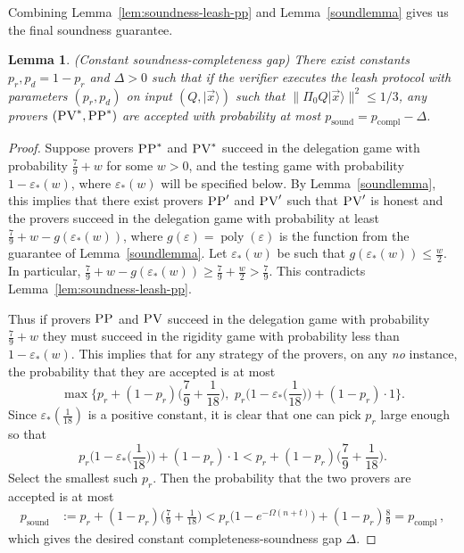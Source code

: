 \documentclass[11pt]{article}
\newtheorem{lemma}[theorem]{Lemma}
\theoremstyle{remark}
\theoremstyle{definition}
\newcommand{\ket}[1]{|#1\rangle}
\DeclareMathOperator{\poly}{poly}
\newcommand{\eps}{\varepsilon}
\newcommand{\pv}{\textsc{PV}}
\newcommand{\pp}{\textsc{PP}}
\begin{document}
\noindent Combining Lemma~\ref{lem:soundness-leash-pp} and Lemma~\ref{soundlemma} gives us the final soundness guarantee.

\begin{lemma}\label{lem:leash-soundness} (Constant soundness-completeness gap)
There exist constants $p_r,p_d=1-p_r$ and $\Delta>0$ such that if the verifier executes the leash protocol with parameters $(p_r,p_d)$ on input $(Q,\ket{\vec{x}})$ such that $\|\Pi_0 Q\ket{\vec{x}}\|^2 \leq 1/3$, any provers $(\pv^*,\pp^*)$ are accepted with probability at most \mbox{$p_{\mathrm{sound}}=p_{\mathrm{compl}}-\Delta$}.  
\end{lemma}

\begin{proof}
Suppose provers $\pp^*$ and $\pv^*$ succeed in the delegation game with probability $\frac79+w$ for some $w>0$, and the testing game with probability $1-\eps_*(w)$, where $\eps_*(w)$ will be specified below. By Lemma~\ref{soundlemma}, this implies that there exist provers $\pp'$ and $\pv'$ such that $\pv'$ is honest and the provers succeed in the delegation game with probability at least $\frac79+w-g(\eps_*(w))$, where $g(\eps) = \poly(\eps)$ is the function from the guarantee of Lemma~\ref{soundlemma}. Let $\eps_*(w)$ be such that $g(\eps_*(w)) \leq \frac{w}{2}$. In particular, $\frac79+w-g(\eps_*(w)) \geq \frac79+\frac{w}{2}>\frac79$. This contradicts Lemma~\ref{lem:soundness-leash-pp}. 

Thus if provers $\pp$ and $\pv$ succeed in the delegation game with probability $\frac79+w$ they must succeed in the rigidity game with probability less than $1-\eps_*(w)$. 
This implies that for any strategy of the provers, on any \textit{no} instance, the probability that they are accepted is at most
\begin{equation}
\max\Big\{p_r+(1-p_r)\Big(\frac79+\frac{1}{18}\Big),\,\, p_r\Big(1-\eps_*\Big(\frac{1}{18}\Big)\Big)+(1-p_r)\cdot 1\Big\}.
\end{equation}
Since $\eps_*(\frac{1}{18})$ is a positive constant, it is clear that one can pick $p_r$ large enough so that 
\begin{equation}
p_r\Big(1-\eps_*\Big(\frac{1}{18}\Big)\Big)+(1-p_r)\cdot 1 < p_r+(1-p_r)\Big(\frac79+\frac{1}{18}\Big).
\end{equation}
Select the smallest such $p_r$. Then the probability that the two provers are accepted is at most 
\begin{align*}
p_{\mathrm{sound}} &:= p_r+(1-p_r)\Big(\frac79+\frac{1}{18}\Big)
< p_r\big(1-e^{-\Omega(n+t)}\big)+(1-p_r)\frac89 
= p_{\mathrm{compl}} \,,
\end{align*}
which gives the desired constant completeness-soundness gap $\Delta$.
\end{proof}
\end{document}
